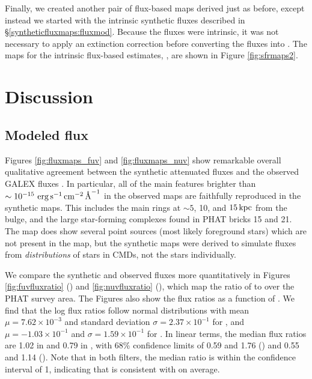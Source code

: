 \documentclass[iop, tighten]{emulateapj}
\begin{document}
Finally, we created another pair of flux-based \sfr{} maps derived just as
before, except instead we started with the intrinsic synthetic fluxes \fxsfhz{}
described in \S \ref{syntheticfluxmaps:fluxmod}. Because the fluxes were
intrinsic, it was not necessary to apply an extinction correction before
converting the fluxes into . The maps for the intrinsic flux-based
\sfr{} estimates, \sfrxz{}, are shown in Figure \ref{fig:sfrmaps2}.




\section{Discussion}\label{discussion}



\subsection{Modeled flux}\label{discussion:modflux}

Figures \ref{fig:fluxmaps_fuv} and \ref{fig:fluxmaps_nuv} show remarkable
overall qualitative agreement between the synthetic attenuated fluxes \fxsfh{}
and the observed GALEX fluxes \fxobs{}. In particular, all of the main features
brighter than $\sim 10^{-15}\, \,\mathrm{erg}\,\mathrm{s}^{-1}\,\mathrm{cm}^{-2}\,\textrm{\AA}^{-1}$ in the observed maps are faithfully
reproduced in the synthetic maps. This includes the main rings at $\sim 5$, 10,
and $15\,\mathrm{kpc}$ from the bulge, and the large star-forming complexes found in PHAT
bricks 15 and 21. The \fnuvobs{} map does show several point sources (most
likely foreground stars) which are not present in the \fnuvsfh{} map, but the
synthetic maps were derived to simulate fluxes from \emph{distributions} of
stars in CMDs, not the stars individually.

We compare the synthetic and observed fluxes more quantitatively in Figures
\ref{fig:fuvfluxratio} (\fuv{}) and \ref{fig:nuvfluxratio} (\nuv{}), which map
the ratio of \fxsfh{} to \fxobs{} over the PHAT survey area. The Figures also
show the flux ratios as a function of \fxobs{}. We find that the log flux
ratios follow normal distributions with mean $\mu = 7.62\times 10^{-3}$ and
standard deviation $\sigma = 2.37\times 10^{-1}$ for \fuv{}, and $\mu =
-1.03\times 10^{-1}$ and $\sigma = 1.59\times 10^{-1}$ for \nuv{}. In linear
terms, the median flux ratios are 1.02 in \fuv{} and 0.79 in \nuv{}, with 68\%
confidence limits of 0.59 and 1.76 (\fuv{}) and 0.55 and 1.14 (\nuv{}). Note
that in both filters, the median ratio is within the confidence interval of 1,
indicating that \fxsfh{} is consistent with \fxobs{} on average.
\end{document}
